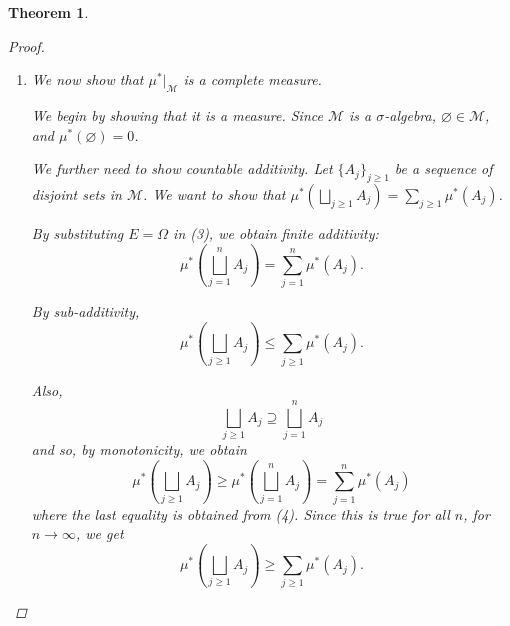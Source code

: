 \documentclass{article}
\newcommand{\M}{\mathcal{M}}
\theoremstyle{spaced}
\newtheorem{theorem}{Theorem}[section]
\begin{document}
\begin{theorem}
\begin{proof}
\begin{enumerate}
\begin{enumerate}
            Hence, $\mu^*\left( E \cap \bigcup_{j = 1}^n A_j \right) = \mu^*\left( E \cap \bigsqcup_{j = 1}^n B_j \right) = \sum_{j = 1}^n \mu^*(E \cap B_j)$. Using this in (2),
                \[ \mu^*(E) \geq \sum_{j = 1}^n \mu^*(E \cap B_j) +  \mu^*\left( E \setminus \bigcup_{j \geq 1} A_j\right) \]
            This is true for all $n$. Hence, 
                \begin{align*}
                    \mu^*(E) &\geq \sum_{j \geq 1} \mu^*(E \cap B_j) + \mu^*\left( E \setminus \bigcup_{j \geq 1} A_j\right) \\
                    &\geq \mu^*\left( \bigsqcup_{j \geq 1} (E \cap B_j) \right) + \mu^*\left( E \setminus \bigcup_{j \geq 1} A_j\right) \tag*{(by subadditivity)}\\
                    &= \mu^*\left( E \cap \bigcup_{j \geq 1} A_j \right) + \mu^*\left( E \setminus \bigcup_{j \geq 1} A_j\right)
                \end{align*}
            thereby showing that $\bigcup_{j \geq 1} A_j$ is in $\M$. Therefore, $\M$ is a $\sigma$-algebra.
        \end{enumerate}

        \item We now show that $\mu^*|_{\M}$ is a complete measure.

        We begin by showing that it is a measure. Since $\M$ is a $\sigma$-algebra, $\varnothing \in \M$, and $\mu^*(\varnothing) = 0$. 
        
        We further need to show countable additivity. Let $\{ A_j \}_{j \geq 1}$ be a sequence of disjoint sets in $\M$. We want to show that $\mu^*\left( \bigsqcup_{j \geq 1} A_j \right) = \sum_{j \geq 1} \mu^*(A_j)$.

        By substituting $E = \Omega$ in (3), we obtain finite additivity:
        \begin{equation}
            \mu^*\left( \bigsqcup_{j = 1}^n A_j \right) = \sum_{j = 1}^{n} \mu^*(A_j).    
        \end{equation}
        
        By sub-additivity,
        \begin{equation}
            \mu^* \left(\bigsqcup_{j \geq 1} A_j \right) \leq \sum_{j \geq 1} \mu^* (A_j).
        \end{equation}

        Also, 
        \[ \bigsqcup_{j \geq 1} A_j \supseteq \bigsqcup_{j = 1}^n A_j \]
        and so, by monotonicity, we obtain
        \[ \mu^*\left( \bigsqcup_{j \geq 1} A_j \right) \geq \mu^* \left( \bigsqcup_{j = 1}^n A_j \right) = \sum_{j = 1}^n \mu^*(A_j) \]
        where the last equality is obtained from (4). Since this is true for all $n$, for $n \to \infty$, we get
       \begin{equation}
       \mu^*\left( \bigsqcup_{j \geq 1} A_j \right) \geq \sum_{j \geq 1} \mu^*(A_j).
       \end{equation}


\end{enumerate}
\end{proof}
\end{theorem}
\end{document}
